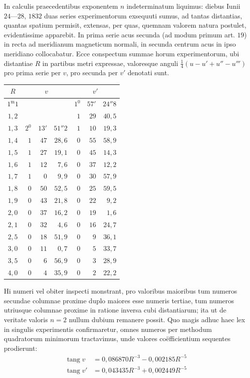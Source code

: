 In calculis praecedentibus exponentem $n$ indeterminatum liquimus: diebus Iunii $24$—$28$, $1832$ duas series experimentorum exsequuti sumus, ad tantas distantias, quantas spatium permisit, extensas, per quas, quemnam valorem natura postulet, evidentissime apparebit. In prima serie acus secunda (ad modum primum art. $19$) in recta ad meridianum magneticum normali, in secunda centrum acus in ipso meridiano collocabatur. Ecce conspectum summae horum experimentorum, ubi distantiae $R$ in partibus metri expressae, valoresque anguli $\frac14(u-u'+u''-u''')$ pro prima serie per $v$, pro secunda per $v'$ denotati sunt.
\begin{center}
\begin{tabular}{c|rrr|rrr}
$R$&\multicolumn{3}{c|}{$v$}&\multicolumn{3}{c}{$v'$}\\\hline
$1^{\mathrm m}1$&&&&$1^0$&$57'$&$24''8$\\
$1{,}2$&&&&$1$&$29$&$40{,}5$\\
$1{,}3$&$2^0$&$13'$&$51''2$&$1$&$10$&$19{,}3$\\
$1{,}4$&$1$&$47$&$28{,}6$&$0$&$55$&$58{,}9$\\
$1{,}5$&$1$&$27$&$19{,}1$&$0$&$45$&$14{,}3$\\
$1{,}6$&$1$&$12$&$7{,}6$&$0$&$37$&$12{,}2$\\
$1{,}7$&$1$&$0$&$9{,}9$&$0$&$30$&$57{,}9$\\
$1{,}8$&$0$&$50$&$52{,}5$&$0$&$25$&$59{,}5$\\
$1{,}9$&$0$&$43$&$21{,}8$&$0$&$22$&$9{,}2$\\
$2{,}0$&$0$&$37$&$16{,}2$&$0$&$19$&$1{,}6$\\
$2{,}1$&$0$&$32$&$4{,}6$&$0$&$16$&$24{,}7$\\
$2{,}5$&$0$&$18$&$51{,}9$&$0$&$9$&$36{,}1$\\
$3{,}0$&$0$&$11$&$0{,}7$&$0$&$5$&$33{,}7$\\
$3{,}5$&$0$&$6$&$56{,}9$&$0$&$3$&$28{,}9$\\
$4{,}0$&$0$&$4$&$35{,}9$&$0$&$2$&$22{,}2$
\end{tabular}
\end{center}

Hi numeri vel obiter inspecti monstrant, pro valoribus maioribus tum numeros secundae columnae proxime duplo maiores esse numeris tertiae, tum numeros utriusque columnae proxime in ratione inversa cubi distantiarum; ita ut de veritate valoris $n=2$ nullum dubium remanere possit. Quo magis adhuc haec
lex in singulis experimentis confirmaretur, omnes numeros per methodum quadratorum minimorum tractavimus, unde valores coëfficientium sequentes prodierunt:
\[
\begin{aligned}
\operatorname{tang}v&=0{,}086870R^{-3}-0{,}002185R^{-5}\\
\operatorname{tang}v'&=0{,}043435R^{-3}+0{,}002449R^{-5}
\end{aligned}
\]

